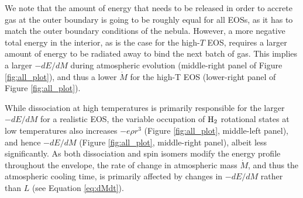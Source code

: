\documentclass[apj]{emulateapj}
\newcommand{\delad}{\nabla_{\rm ad}}
\newcommand{\co}{_{\rm c}}
\begin{document}
We note that the amount of energy that needs to be released in order to accrete gas at the outer boundary is going to be roughly equal for all EOSs, as it has to match the outer boundary conditions of the nebula. However, a more negative total energy in the interior, as is the case for the high-$T$ EOS, requires a larger amount of energy to be radiated away to bind the next batch of gas. This implies a larger $-dE/dM$ during atmospheric evolution (middle-right panel of Figure \ref{fig:all_plot}), and thus a lower $\dot{M}$ for the high-T EOS (lower-right panel of Figure \ref{fig:all_plot}). 



While dissociation at high temperatures is primarily responsible for the larger $-dE/dM$ for a realistic EOS, the variable occupation of $\rm H_2$ rotational states at low temperatures also increases $-e \rho r^3$ (Figure \ref{fig:all_plot}, middle-left panel), and hence $-dE/dM$ (Figure \ref{fig:all_plot}, middle-right panel), albeit less significantly. As both dissociation and spin isomers modify the energy profile throughout the envelope, the rate of change in atmospheric mass $\dot{M}$, and thus the atmospheric cooling time, is primarily affected by changes in $-dE/dM$ rather than $L$ (see Equation \ref{eq:dMdt}). 





\end{document}
